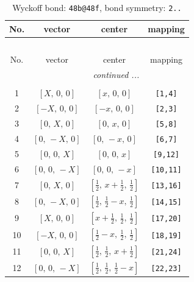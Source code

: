 \documentclass[fleqn,8pt]{jsarticle}
\begin{document}
\renewcommand{\arraystretch}{1.2}
\begin{longtable}{cccc}
\caption{Wyckoff bond: {\tt 48b@48f}, bond symmetry: {\tt 2..}}
 \\
 \hline \hline
No. & vector & center & mapping \\ \hline \endfirsthead

\multicolumn{3}{l}{\tablename\ \thetable{}} \\
 \hline \hline
No. & vector & center & mapping \\ \hline \endhead

 \hline \hline
\multicolumn{3}{r}{\footnotesize\it continued ...} \\ \endfoot

 \hline \hline
\multicolumn{3}{r}{} \\ \endlastfoot

1 & $\left[ X,\, 0,\, 0 \right]$ & $\left[ x,\, 0,\, 0 \right]$ & {\tt [1,4]} \\ \hline
2 & $\left[ - X,\, 0,\, 0 \right]$ & $\left[ - x,\, 0,\, 0 \right]$ & {\tt [2,3]} \\ \hline
3 & $\left[ 0,\, X,\, 0 \right]$ & $\left[ 0,\, x,\, 0 \right]$ & {\tt [5,8]} \\ \hline
4 & $\left[ 0,\, - X,\, 0 \right]$ & $\left[ 0,\, - x,\, 0 \right]$ & {\tt [6,7]} \\ \hline
5 & $\left[ 0,\, 0,\, X \right]$ & $\left[ 0,\, 0,\, x \right]$ & {\tt [9,12]} \\ \hline
6 & $\left[ 0,\, 0,\, - X \right]$ & $\left[ 0,\, 0,\, - x \right]$ & {\tt [10,11]} \\ \hline
7 & $\left[ 0,\, X,\, 0 \right]$ & $\left[ \frac{1}{2},\, x + \frac{1}{2},\, \frac{1}{2} \right]$ & {\tt [13,16]} \\ \hline
8 & $\left[ 0,\, - X,\, 0 \right]$ & $\left[ \frac{1}{2},\, \frac{1}{2} - x,\, \frac{1}{2} \right]$ & {\tt [14,15]} \\ \hline
9 & $\left[ X,\, 0,\, 0 \right]$ & $\left[ x + \frac{1}{2},\, \frac{1}{2},\, \frac{1}{2} \right]$ & {\tt [17,20]} \\ \hline
10 & $\left[ - X,\, 0,\, 0 \right]$ & $\left[ \frac{1}{2} - x,\, \frac{1}{2},\, \frac{1}{2} \right]$ & {\tt [18,19]} \\ \hline
11 & $\left[ 0,\, 0,\, X \right]$ & $\left[ \frac{1}{2},\, \frac{1}{2},\, x + \frac{1}{2} \right]$ & {\tt [21,24]} \\ \hline
12 & $\left[ 0,\, 0,\, - X \right]$ & $\left[ \frac{1}{2},\, \frac{1}{2},\, \frac{1}{2} - x \right]$ & {\tt [22,23]} \\
\end{longtable}
\end{document}
